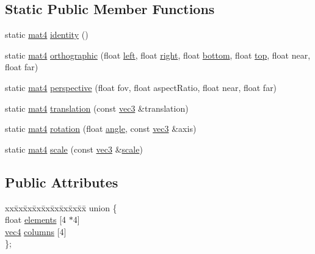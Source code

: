 \subsection*{Static Public Member Functions}
\begin{DoxyCompactItemize}
\item 
static \hyperlink{structu__engine_1_1maths_1_1mat4}{mat4} \hyperlink{structu__engine_1_1maths_1_1mat4_af6320e9644c38c1ad6ccf8579b3579f9}{identity} ()
\item 
static \hyperlink{structu__engine_1_1maths_1_1mat4}{mat4} \hyperlink{structu__engine_1_1maths_1_1mat4_acad18e49f82c123ffc29f07f32110d54}{orthographic} (float \hyperlink{glew_8h_a6358510bdde486b81c7951ee5c470ee4}{left}, float \hyperlink{glew_8h_a18826d74cd7b4e758c25b4ba66e20be2}{right}, float \hyperlink{glew_8h_a111675ec0799cd2ffecf18fd6c4ba449}{bottom}, float \hyperlink{glew_8h_a2d9dcbd99961f3384f2c4d57014e0c38}{top}, float near, float far)
\item 
static \hyperlink{structu__engine_1_1maths_1_1mat4}{mat4} \hyperlink{structu__engine_1_1maths_1_1mat4_adc7f54a60b855ece7513bdf946f96c39}{perspective} (float fov, float aspect\+Ratio, float near, float far)
\item 
static \hyperlink{structu__engine_1_1maths_1_1mat4}{mat4} \hyperlink{structu__engine_1_1maths_1_1mat4_a611759978e5699de27e278913a499239}{translation} (const \hyperlink{structu__engine_1_1maths_1_1vec3}{vec3} \&translation)
\item 
static \hyperlink{structu__engine_1_1maths_1_1mat4}{mat4} \hyperlink{structu__engine_1_1maths_1_1mat4_a4eaef201f513b1a506962323d625e928}{rotation} (float \hyperlink{glew_8h_a6d7a98b0d979b9411a4344a98a7a6122}{angle}, const \hyperlink{structu__engine_1_1maths_1_1vec3}{vec3} \&axis)
\item 
static \hyperlink{structu__engine_1_1maths_1_1mat4}{mat4} \hyperlink{structu__engine_1_1maths_1_1mat4_a7c7d37cb58d4c116c945308592bf65e8}{scale} (const \hyperlink{structu__engine_1_1maths_1_1vec3}{vec3} \&\hyperlink{glew_8h_a281421b881aa7a1266842b73a3bc7655}{scale})
\end{DoxyCompactItemize}
\subsection*{Public Attributes}
\begin{DoxyCompactItemize}
\item 
\begin{tabbing}
xx\=xx\=xx\=xx\=xx\=xx\=xx\=xx\=xx\=\kill
union \{\\
\>float \hyperlink{structu__engine_1_1maths_1_1mat4_a0efbb2abf6b7fd363620e1b0130a7e1c}{elements} \mbox{[}4 $\ast$4\mbox{]}\\
\>\hyperlink{structu__engine_1_1maths_1_1vec4}{vec4} \hyperlink{structu__engine_1_1maths_1_1mat4_a6aad7268685211b538669541ff52895e}{columns} \mbox{[}4\mbox{]}\\
\}; \\

\end{tabbing}\end{DoxyCompactItemize}
